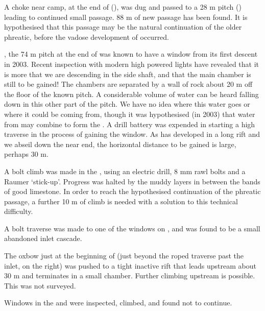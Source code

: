 A choke near camp, at the end of  (), was dug and passed to a 28 m pitch ()
leading to continued small passage. 88 m of new passage has been found.
It is hypothesised that this passage may be the natural continuation of
the older  phreatic, before the vadose
development of  occurred.

, the 74 m pitch at the end of  was
known to have a window from its first descent in 2003. Recent
inspection with modern high powered lights have revealed that it is more
that we are descending in the side shaft, and that the main chamber is
still to be gained! The chambers are separated by a wall of rock about
20 m off the floor of the known pitch. A considerable volume of water
can be heard falling down in this other part of the pitch. We have no
idea where this water goes or where it could be coming from, though it
was hypothesised (in 2003) that water from  may combine to form the . A drill battery was
expended in starting a high traverse in the process of gaining the
window. As  has developed in a long rift
and we abseil down the near end, the horizontal distance to be gained is
large, perhaps 30 m.


A bolt climb was made in the , using an
electric drill, 8 mm rawl bolts and a Raumer `stick-up'. Progress was
halted by the muddy layers in between the bands of good limestone. In
order to reach the hypothesised continuation of the phreatic passage, a
further 10 m of climb is needed with a solution to this technical
difficulty.

A bolt traverse was made to one of the windows on , and
was found to be a small abandoned inlet cascade.

The oxbow just at the beginning of  (just
beyond the roped traverse past the inlet, on the right) was pushed to a
tight inactive rift that leads upstream about 30 m and terminates in a
small chamber. Further climbing upstream is possible. This was not
surveyed.

Windows in the  and  were inspected,
climbed, and found not to continue.

